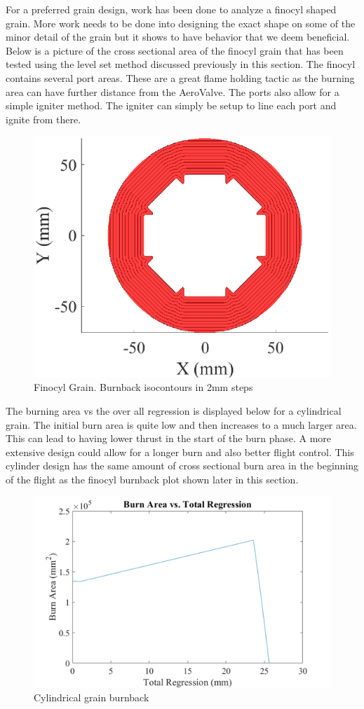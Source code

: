 For a preferred grain design, work has been done to analyze a finocyl shaped grain. More work needs to be done into designing the exact shape on some of the minor detail of the grain but it shows to have behavior that we deem beneficial. Below is a picture of the cross sectional area of the finocyl grain that has been tested using the level set method discussed previously in this section. The finocyl contains several port areas. These are a great flame holding tactic as the burning area can have further distance from the AeroValve. The ports also allow for a simple igniter method. The igniter can simply be setup to line each port and ignite from there.

\begin{figure}[H]
    \centering
    \includegraphics[width=0.7\linewidth]{LevelSet_Figures/FinocylBurnback.eps}
    \caption{Finocyl Grain. Burnback isocontours in 2mm steps}
    \label{fig:finocylgrainshape}
\end{figure}

The burning area vs the over all regression is displayed below for a cylindrical grain. The initial burn area is quite low and then increases to a much larger area. This can lead to having lower thrust in the start of the burn phase. A more extensive design could allow for a longer burn and also better flight control. This cylinder design has the same amount of cross sectional burn area in the beginning of the flight as the finocyl burnback plot shown later in this section. 

\begin{figure}[H]
    \centering
    \includegraphics[width=0.7\linewidth]{CombustorDesign/cylindricalgrainburnback.png}
    \caption{Cylindrical grain burnback}
    \label{fig:cylindricalGrainBurnback}
\end{figure}

